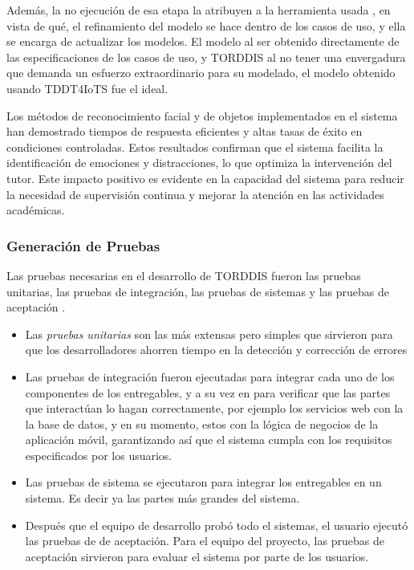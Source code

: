 \documentclass[a4paper,fleqn]{cas-sc}
\begin{document}
				Además, la no ejecución de esa etapa la atribuyen a la herramienta usada \citep{Guerrero2024Test}, en vista de qué, el refinamiento del modelo se hace dentro de los casos de uso, y ella se encarga de actualizar los modelos. El modelo al ser obtenido directamente de las especificaciones de los casos de uso, y TORDDIS al no tener una envergadura que demanda un esfuerzo extraordinario para su modelado, el modelo obtenido usando TDDT4IoTS fue el ideal.
			
				Los métodos de reconocimiento facial y de objetos implementados en el sistema han demostrado tiempos de respuesta eficientes y altas tasas de éxito en condiciones controladas. Estos resultados confirman que el sistema facilita la identificación de emociones y distracciones, lo que optimiza la intervención del tutor. Este impacto positivo es evidente en la capacidad del sistema para reducir la necesidad de supervisión continua y mejorar la atención en las actividades académicas.
				
			\subsubsection{Generación de Pruebas}
				Las pruebas necesarias en el desarrollo de TORDDIS fueron las pruebas unitarias, las pruebas de integración, las pruebas de sistemas y las pruebas de aceptación \citep{Sciarra2024Smash}.
			
				\begin{itemize}
					\item Las \textit{pruebas unitarias} son las más extensas pero simples que sirvieron para que los desarrolladores ahorren tiempo en la detección y corrección de errores \citep{Mafi2024Regression}
					\item Las pruebas de integración fueron ejecutadas para integrar cada uno de los componentes de los entregables, y a su vez en para verificar que las partes que interactúan lo hagan correctamente, por ejemplo los servicios web con la la base de datos, y en su momento, estos con la lógica de negocios de la aplicación móvil, garantizando así que el sistema cumpla con los requisitos especificados por los usuarios.
					\item Las pruebas de sistema se ejecutaron para integrar los entregables en un sistema. Es decir ya las partes más grandes del sistema.
					\item Después que el equipo de desarrollo probó todo el sistemas, el usuario ejecutó las pruebas de de aceptación. Para el equipo del proyecto, las pruebas de aceptación sirvieron para evaluar el sistema por parte de los usuarios.
				\end{itemize}
			
\end{document}
